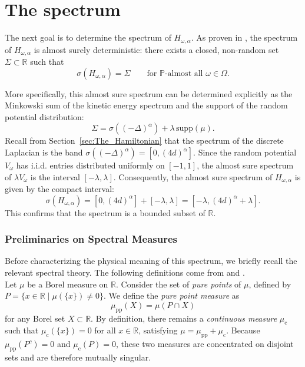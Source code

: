 \documentclass[11pt, a4paper, UKenglish, oneside]{book}
\theoremstyle{plain}
\theoremstyle{remark}
\theoremstyle{definition}
\numberwithin{equation}{section}
\numberwithin{theorem}{section}
\begin{document}
\section{The spectrum}
\label{sec:the_spectrum}
The next goal is to determine the spectrum of $H_{\omega,\alpha}$. As proven in \cite[Theorem 2]{stolz2011}, the spectrum of $H_{\omega,\alpha}$ is almost surely deterministic: there exists a closed, non-random set $\Sigma \subset \mathbb{R}$ such that
\begin{equation}
    \sigma(H_{\omega,\alpha}) = \Sigma \qquad \text{for } \mathbb{P}\text{-almost all } \omega \in \Omega.
\end{equation}

More specifically,  this almost sure spectrum can be determined explicitly as the Minkowski sum of the kinetic energy spectrum and the support of the random potential distribution:
\begin{equation}
    \Sigma = \sigma((-\Delta)^\alpha) + \lambda \, \mathrm{supp}(\mu).
\end{equation}
Recall from Section~\ref{sec:The_Hamiltonian} that the spectrum of the discrete Laplacian is the band $\sigma((-\Delta)^\alpha) = [0, (4d)^\alpha]$. Since the random potential $V_\omega$ has i.i.d. entries distributed uniformly on $[-1, 1]$, the almost sure spectrum of $\lambda V_\omega$ is the interval $[-\lambda, \lambda]$. Consequently, the almost sure spectrum of $H_{\omega, \alpha}$ is given by the compact interval:
\begin{equation}
    \sigma(H_{\omega,\alpha}) = [0, (4d)^\alpha] + [-\lambda, \lambda] = [-\lambda, (4d)^\alpha + \lambda].
\end{equation}
This confirms that the spectrum is a bounded subset of $\mathbb{R}$.

\subsubsection*{Preliminaries on Spectral Measures}

Before characterizing the physical meaning of this spectrum, we briefly recall the relevant spectral theory. The following definitions come from \cite{reedsimon1980} and \cite{rudin1987}.\\

Let $\mu$ be a Borel measure on $\mathbb{R}$. Consider the set of \textit{pure points} of $\mu$, defined by $P = \{x \in \mathbb{R} \mid \mu(\{x\}) \ne 0\}$. We define the \textit{pure point measure} as 
\begin{equation*}
    \mu_{\mathrm{pp}}(X) = \mu(P \cap X)
\end{equation*}
for any Borel set $X \subset \mathbb{R}$. By definition, there remains a \textit{continuous measure} $\mu_{\mathrm{c}}$ such that $\mu_{\mathrm{c}}(\{x\}) = 0$ for all $x \in \mathbb{R}$, satisfying $\mu = \mu_{\mathrm{pp}} + \mu_{\mathrm{c}}$. Because $\mu_{\mathrm{pp}}(P^c) = 0$ and $\mu_{\mathrm{c}}(P) = 0$, these two measures are concentrated on disjoint sets and are therefore mutually singular.
\end{document}
